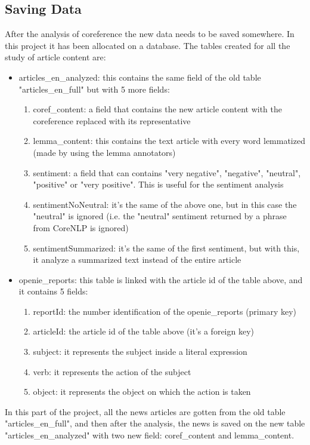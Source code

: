 \subsection{Saving Data}
After the analysis of coreference the new data needs to be saved somewhere. In this project it has been allocated on a database. The tables created for all the study of article content are:
\begin{itemize}
	\item articles\_en\_analyzed: this contains the same field of the old table "articles\_en\_full" but with 5 more fields:
	\begin{enumerate}
		\item coref\_content: a field that contains the new article content with the coreference replaced with its representative
		\item lemma\_content: this contains the text article with every word lemmatized (made by using the lemma annotators)
		\item sentiment: a field that can contains "very negative", "negative", "neutral", "positive" or "very positive". This is useful for the sentiment analysis
		\item sentimentNoNeutral: it's the same of the above one, but in this case the "neutral" is ignored (i.e. the "neutral" sentiment returned by a phrase from CoreNLP is ignored)
		\item sentimentSummarized: it's the same of the first sentiment, but with this, it analyze a summarized text instead of the entire article
	\end{enumerate}
	\item openie\_reports: this table is linked with the article id of the table above, and it contains 5 fields:
	\begin{enumerate}
		\item reportId: the number identification of the openie\_reports (primary key)
		\item articleId: the article id of the table above (it's a foreign key)
		\item subject: it represents the subject inside a literal expression
		\item verb: it represents the action of the subject
		\item object: it represents the object on which the action is taken
	\end{enumerate}
\end{itemize}
In this part of the project, all the news articles are gotten from the old table "articles\_en\_full", and then after the analysis, the news is saved on the new table "articles\_en\_analyzed" with two new field: coref\_content and lemma\_content.

